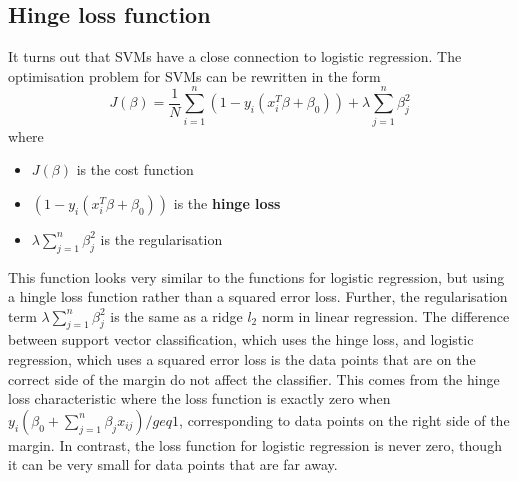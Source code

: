 \documentclass[CS5104-Notes.tex]{subfiles}
\begin{document}
\subsection{Hinge loss function}
It turns out that SVMs have a close connection to logistic regression. The optimisation problem for SVMs can be rewritten in the form
\begin{equation}
J(\beta) = \frac{1}{N}\sum_{i=1}^{n}(1 - y_{i}(x_{i}^{T}\beta + \beta_{0})) + \lambda \sum_{j=1}^{n}\beta_{j}^{2}
\end{equation}
where
\begin{itemize}
\item $J(\beta)$ is the cost function
\item $(1 - y_{i}(x_{i}^{T}\beta + \beta_{0}))$ is the \textbf{hinge loss}
\item $\lambda \sum_{j=1}^{n}\beta_{j}^{2}$ is the regularisation
\end{itemize}
This function looks very similar to the functions for logistic regression, but using a hingle loss function rather than a squared error loss. Further, the regularisation term $\lambda \sum_{j=1}^{n}\beta_{j}^{2}$ is the same as a ridge $l_{2}$ norm in linear regression.
\n
The difference between support vector classification, which uses the hinge loss, and logistic regression, which uses a squared error loss is the data points that are on the correct side of the margin do not affect the classifier. This comes from the hinge loss characteristic where the loss function is exactly zero when $y_{i}(\beta_{0} + \sum_{j=1}^{n}\beta_{j}x_{ij}) /geq 1$, corresponding to data points on the right side of the margin. In contrast, the loss function for logistic regression is never zero, though it can be very small for data points that are far away.
\end{document}
